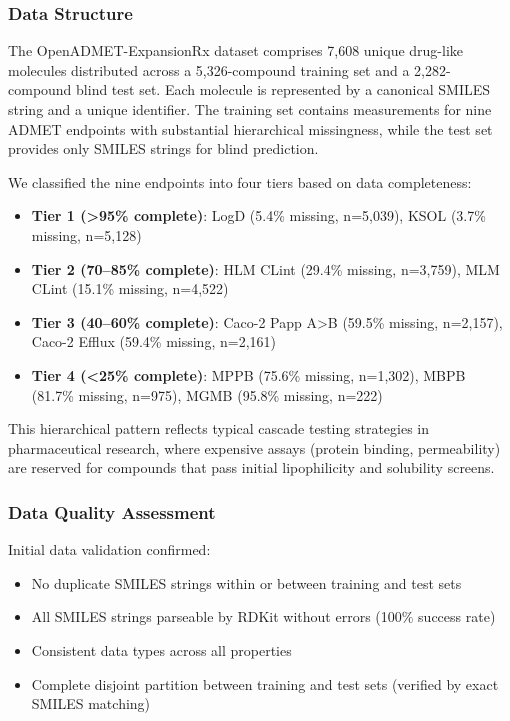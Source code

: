 \documentclass[11pt,a4paper]{article}
\begin{document}
\subsubsection{Data Structure}

The OpenADMET-ExpansionRx dataset comprises 7,608 unique drug-like molecules distributed across a 5,326-compound training set and a 2,282-compound blind test set. Each molecule is represented by a canonical SMILES string and a unique identifier. The training set contains measurements for nine ADMET endpoints with substantial hierarchical missingness, while the test set provides only SMILES strings for blind prediction.

We classified the nine endpoints into four tiers based on data completeness:
\begin{itemize}
    \item \textbf{Tier 1 (>95\% complete)}: LogD (5.4\% missing, n=5,039), KSOL (3.7\% missing, n=5,128)
    \item \textbf{Tier 2 (70--85\% complete)}: HLM CLint (29.4\% missing, n=3,759), MLM CLint (15.1\% missing, n=4,522)
    \item \textbf{Tier 3 (40--60\% complete)}: Caco-2 Papp A>B (59.5\% missing, n=2,157), Caco-2 Efflux (59.4\% missing, n=2,161)
    \item \textbf{Tier 4 (<25\% complete)}: MPPB (75.6\% missing, n=1,302), MBPB (81.7\% missing, n=975), MGMB (95.8\% missing, n=222)
\end{itemize}

This hierarchical pattern reflects typical cascade testing strategies in pharmaceutical research, where expensive assays (protein binding, permeability) are reserved for compounds that pass initial lipophilicity and solubility screens.

\subsubsection{Data Quality Assessment}

Initial data validation confirmed:
\begin{itemize}
    \item No duplicate SMILES strings within or between training and test sets
    \item All SMILES strings parseable by RDKit without errors (100\% success rate)
    \item Consistent data types across all properties
    \item Complete disjoint partition between training and test sets (verified by exact SMILES matching)
\end{itemize}
\end{document}
